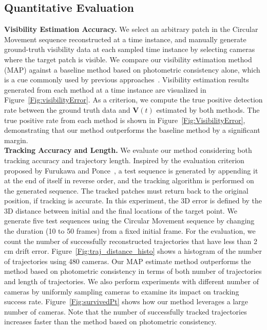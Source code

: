 \subsection{Quantitative Evaluation}
\noindent\textbf{Visibility Estimation Accuracy.} We select an arbitrary patch in the Circular Movement sequence reconstructed at a time instance, and manually generate ground-truth visibility data at each sampled time instance by selecting cameras where the target patch is visible. We compare our visibility estimation method (MAP) against a baseline method based on photometric consistency alone, which is a cue commonly used by previous approaches~\cite{Carceroni2002,Devernay2006,Furukawa2008}. Visibility estimation results generated from each method at a time instance are visualized in Figure~\ref{Fig:visibilityError}. As a criterion, we compute the true positive detection rate between the ground truth data and $\mathbf{V}(t)$ estimated by both methods. The true positive rate from each method is shown in Figure~\ref{Fig:VisibilityError}, demonstrating that our method outperforms the baseline method by a significant margin.\\ %
\noindent \textbf{Tracking Accuracy and Length.}
We evaluate our method considering both tracking accuracy and trajectory length. Inspired by the evaluation criterion proposed by Furukawa and Ponce~\cite{Furukawa2008}, a test sequence is generated by appending it at the end of itself in reverse order, and the tracking algorithm is performed on the generated sequence. The tracked patches must return back to the original position, if tracking is accurate. In this experiment, the 3D error is defined by the 3D distance between initial and the final locations of the target point. We generate five test sequences using the Circular Movement sequence by changing the duration (10 to 50 frames) from a fixed initial frame. For the evaluation, we count the number of successfully reconstructed trajectories that have less than 2 cm drift error. Figure~\ref{Fig:traj_distance_histo} shows a histogram of the number of trajectories using 480 cameras.  Our MAP estimate method outperforms the method based on photometric consistency in terms of both number of trajectories and length of trajectories. We also perform experiments with different number of cameras by uniformly sampling cameras to examine its impact on tracking success rate. Figure~\ref{Fig:survivedPt} shows how our method leverages a large number of cameras. Note that the number of successfully tracked trajectories increases faster than the method based on photometric consistency. 
